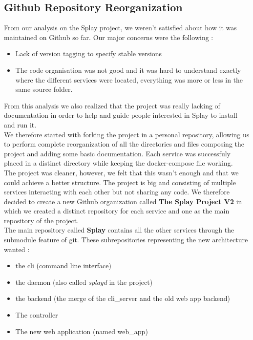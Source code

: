 \documentclass{eplmastersthesis}
\begin{document}
      \subsection{Github Repository Reorganization}

        From our analysis on the Splay project, we weren't satisfied about how
        it was maintained on Github so far. Our major concerns were the
        following :

        \begin{itemize}
          \item Lack of version tagging to specify stable versions
          \item The code organisation was not good and it was hard to
          understand exactly where the different services were located,
          everything was more or less in the same source folder.
        \end{itemize}

        From this analysis we also realized that the project was really
        lacking of documentation in order to help and guide people interested
        in Splay to install and run it.\\

        We therefore started with forking the project in a personal repository,
        allowing us to perform complete reorganization of all the directories
        and files composing the project and adding some basic documentation.
        Each service was successfuly placed in a distinct directory while
        keeping the docker-compose file working.\\
        The project was cleaner, however, we felt that this wasn't enough
        and that we could achieve a better structure. The project is big and
        consisting of multiple services interacting with each other but
        not sharing any code. We therefore decided to create a new Github
        organization called \textbf{The Splay Project V2} in which we created
        a distinct repository for each service and one as the main repository
        of the project.\\

        The main repository called \textbf{Splay} contains all the other services
        through the submodule \cite{GitSubmodules} feature of git. These
        subrepositories representing the new architecture wanted :

        \begin{itemize}
          \item the cli (command line interface)
          \item the daemon (also called \textit{splayd} in the project)
          \item the backend (the merge of the cli\_server and the old web app backend)
          \item The controller
          \item The new web application (named web\_app)
        \end{itemize}
\end{document}

